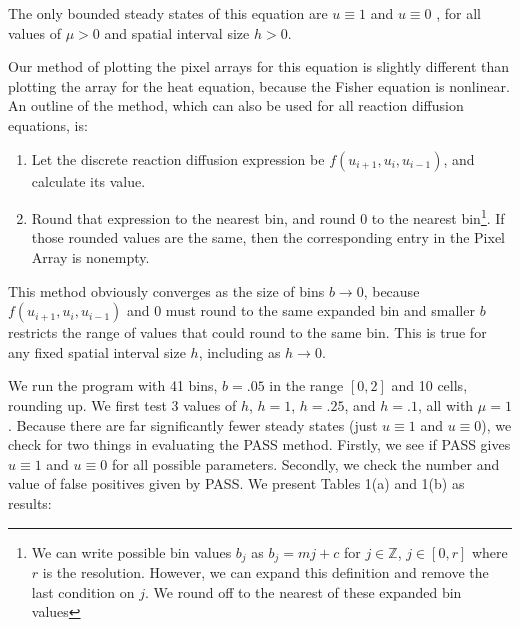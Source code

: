 \documentclass[11pt]{article}
\begin{document}
\noindent The only bounded steady states of this equation are $u \equiv 1$ and $u \equiv 0$ \citep{Fisher}, for all values of $\mu > 0$ and spatial interval size $h > 0$.

Our method of plotting the pixel arrays for this equation is slightly different than plotting the array for the heat equation, because the Fisher equation is nonlinear. An outline of the method, which can also be used for all reaction diffusion equations, is:

\begin{enumerate}
    \item Let the discrete reaction diffusion expression be $f(u_{i+1}, u_i, u_{i-1})$, and calculate its value.
    \item  Round that expression to the nearest bin, and round 0 to the nearest bin\footnote{We can write possible bin values $b_j$ as $b_j = mj + c$ for $j \in \mathbb{Z}$, $j \in [0,r]$ where $r$ is the resolution. However, we can expand this definition and remove the last condition on $j$. We round off to the nearest of these expanded bin values}. If those rounded values are the same, then the corresponding entry in the Pixel Array is nonempty.
\end{enumerate}

This method obviously converges as the size of bins $b \rightarrow 0$, because $f(u_{i+1}, u_i, u_{i-1})$ and 0 must round to the same expanded bin and smaller $b$ restricts the range of values that could round to the same bin. This is true for any fixed spatial interval size $h$, including as $h \rightarrow 0$.

We run the program with 41 bins, $b = .05$ in the range $[0,2]$ and 10 cells, rounding up. We first test 3 values of $h$, $h = 1$, $h = .25$, and $h = .1$, all with $\mu = 1$. Because there are far significantly fewer steady states (just $u \equiv 1$ and $u \equiv 0$), we check for two things in evaluating the PASS method. Firstly, we see if PASS gives $u \equiv 1$ and $u \equiv 0$ for all possible parameters. Secondly, we check the number and value of false positives given by PASS. We present Tables 1(a) and 1(b) as results:

\end{document}
